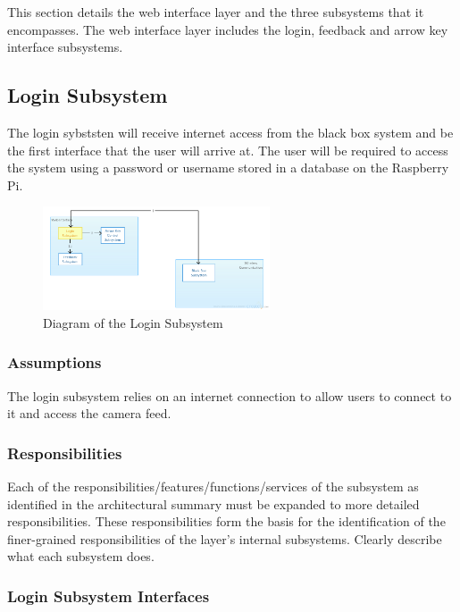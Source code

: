 This section details the web interface layer and the three subsystems that it encompasses. The web interface layer includes the login, feedback and arrow key interface subsystems.

\subsection{Login Subsystem}
The login sybststen will receive internet access from the black box system and be the first interface that the user will arrive at. The user will be required to access the system using a password or username stored in a database on the Raspberry Pi.

\begin{figure}[h!]
	\centering
 	\includegraphics[width=0.60\textwidth]{images/ADSdiagrams/loginsubsystem.png}
 \caption{Diagram of the Login Subsystem}
\end{figure}

\subsubsection{Assumptions}
The login subsystem relies on an internet connection to allow users to connect to it and access the camera feed.

\subsubsection{Responsibilities}
Each of the responsibilities/features/functions/services of the subsystem as identified in the architectural summary must be expanded to more detailed responsibilities. These responsibilities form the basis for the identification of the finer-grained responsibilities of the layer's internal subsystems. Clearly describe what each subsystem does.

\subsubsection{Login Subsystem  Interfaces}

